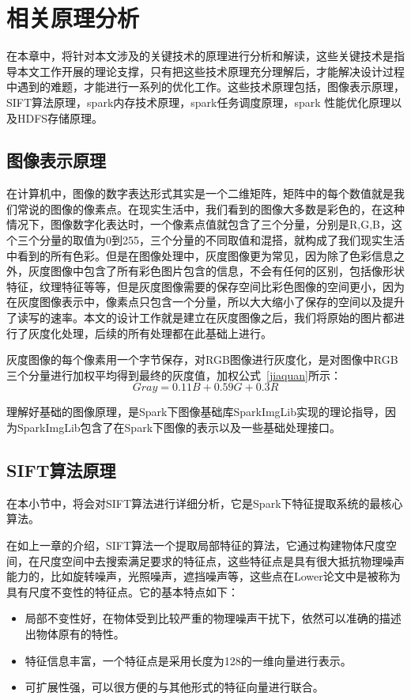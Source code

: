 ﻿\chapter{相关原理分析}
\label{xiangguanyuanli}
在本章中，将针对本文涉及的关键技术的原理进行分析和解读，这些关键技术是指导本文工作开展的理论支撑，只有把这些技术原理充分理解后，才能解决设计过程中遇到的难题，才能进行一系列的优化工作。这些技术原理包括，图像表示原理，SIFT算法原理，spark内存技术原理，spark任务调度原理，spark 性能优化原理以及HDFS存储原理。
\section{图像表示原理}
在计算机中，图像的数字表达形式其实是一个二维矩阵，矩阵中的每个数值就是我们常说的图像的像素点。在现实生活中，我们看到的图像大多数是彩色的，在这种情况下，图像数字化表达时，一个像素点值就包含了三个分量，分别是R,G,B，这个三个分量的取值为0到255，三个分量的不同取值和混搭，就构成了我们现实生活中看到的所有色彩。但是在图像处理中，灰度图像更为常见，因为除了色彩信息之外，灰度图像中包含了所有彩色图片包含的信息，不会有任何的区别，包括像形状特征，纹理特征等等，但是灰度图像需要的保存空间比彩色图像的空间更小，因为在灰度图像表示中，像素点只包含一个分量，所以大大缩小了保存的空间以及提升了读写的速率。本文的设计工作就是建立在灰度图像之后，我们将原始的图片都进行了灰度化处理，后续的所有处理都在此基础上进行。

灰度图像的每个像素用一个字节保存，对RGB图像进行灰度化，是对图像中RGB三个分量进行加权平均得到最终的灰度值，加权公式~\ref{jiaquan}所示：
\begin{equation}\label{jiaquan}
 Gray = 0.11B + 0.59G + 0.3R
\end{equation}

理解好基础的图像原理，是Spark下图像基础库SparkImgLib实现的理论指导，因为SparkImgLib包含了在Spark下图像的表示以及一些基础处理接口。
\section{SIFT算法原理}
\label{sec:sift}
在本小节中，将会对SIFT算法进行详细分析，它是Spark下特征提取系统的最核心算法。

在如上一章的介绍，SIFT算法一个提取局部特征的算法，它通过构建物体尺度空间，在尺度空间中去搜索满足要求的特征点，这些特征点是具有很大抵抗物理噪声能力的，比如旋转噪声，光照噪声，遮挡噪声等，这些点在Lower论文中是被称为具有尺度不变性的特征点。它的基本特点如下：
\begin{itemize}
\item 局部不变性好，在物体受到比较严重的物理噪声干扰下，依然可以准确的描述出物体原有的特性。
\item 特征信息丰富，一个特征点是采用长度为128的一维向量进行表示。
\item 可扩展性强，可以很方便的与其他形式的特征向量进行联合。
\end{itemize}

